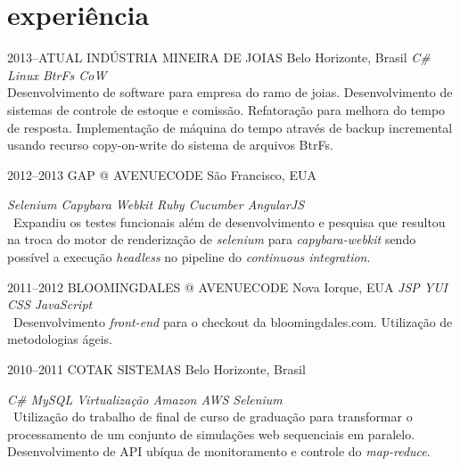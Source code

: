 \documentclass[]{friggeri-cv}
\begin{document}
\section{experiência}

\begin{entrylist}


\entry
{2013--ATUAL}
{INDÚSTRIA MINEIRA DE JOIAS}
{Belo Horizonte, Brasil}
{\emph{\bullet C\# \bullet Linux \bullet BtrFs CoW  } \\ Desenvolvimento de software para empresa do ramo de joias. Desenvolvimento de sistemas de controle de estoque e comissão. Refatoração para melhora do tempo de resposta. Implementação de máquina do tempo através de backup incremental usando recurso copy-on-write do sistema de arquivos BtrFs. }


\entry
{2012--2013}
{GAP @ AVENUECODE}
{São Francisco, EUA}
{\emph{\bullet Selenium \bullet Capybara \bullet Webkit \bullet Ruby \bullet Cucumber \bullet AngularJS } \\
\
Expandiu os testes funcionais além de desenvolvimento e pesquisa que resultou na troca do motor de renderização de \textit{selenium} para \textit{capybara-webkit} sendo possível a execução \textit{headless} no pipeline do \textit{continuous integration}.%

}


\entry
{2011--2012}
{BLOOMINGDALES @ AVENUECODE}
{Nova Iorque, EUA}
{\emph{\bullet JSP \bullet YUI \bullet CSS \bullet JavaScript } \\
\
Desenvolvimento \textit{front-end} para o checkout da bloomingdales.com. Utilização de metodologias ágeis.
}

\entry
{2010--2011}
{COTAK SISTEMAS}
{Belo Horizonte, Brasil}
{\emph{\bullet C\# \bullet MySQL \bullet Virtualização \bullet Amazon AWS \bullet Selenium } \\
\
Utilização do trabalho de final de curso de graduação para transformar o processamento de um conjunto de simulações web sequenciais em paralelo. Desenvolvimento de API ubíqua de monitoramento e controle do \textit{map-reduce}.

}
\end{entrylist}
\end{document}
